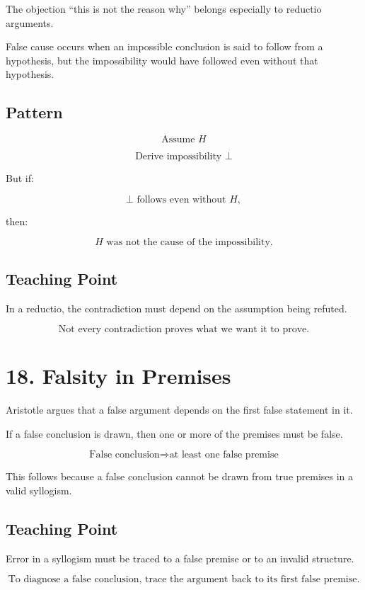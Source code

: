 \documentclass[12pt]{article}
\begin{document}
The objection ``this is not the reason why'' belongs especially to reductio
arguments.

False cause occurs when an impossible conclusion is said to follow from a
hypothesis, but the impossibility would have followed even without that
hypothesis.

\subsection*{Pattern}

\[
\text{Assume } H
\]

\[
\text{Derive impossibility } \bot
\]

But if:

\[
\bot \text{ follows even without } H,
\]

then:

\[
H \text{ was not the cause of the impossibility.}
\]

\subsection*{Teaching Point}

In a reductio, the contradiction must depend on the assumption being refuted.

\[
\boxed{
\text{Not every contradiction proves what we want it to prove.}
}
\]

\section*{18. Falsity in Premises}

Aristotle argues that a false argument depends on the first false statement in
it.

If a false conclusion is drawn, then one or more of the premises must be false.

\[
\boxed{
\text{False conclusion} \Rightarrow \text{at least one false premise}
}
\]

This follows because a false conclusion cannot be drawn from true premises in a
valid syllogism.

\subsection*{Teaching Point}

Error in a syllogism must be traced to a false premise or to an invalid
structure.

\[
\boxed{
\text{To diagnose a false conclusion, trace the argument back to its first false premise.}
}
\]
\end{document}
